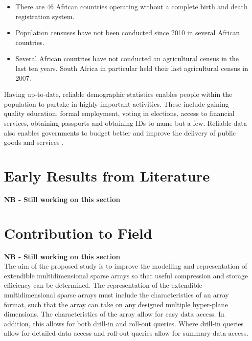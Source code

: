 \begin{itemize}
	\item There are 46 African countries operating without a complete birth and death registration system.
	\item Population censuses have not been conducted since 2010 in several African countries.
	\item Several African countries have not conducted an agricultural census in the last ten years. South Africa in particular held their last agricultural census in 2007.
\end{itemize}

Having up-to-date, reliable demographic statistics enables people within the population to partake in highly important activities. These include gaining quality education, formal employment, voting in elections, access to financial services, obtaining passports and obtaining IDs to name but a few. Reliable data also enables governments to budget better and improve the delivery of public goods and services \cite{mo:2015:sin}.

\section{Early Results from Literature}
\textbf{NB - Still working on this section}

\section{Contribution to Field}
\textbf{NB - Still working on this section}\\
The aim of the proposed study is to improve the modelling and representation of extendible multidimensional sparse arrays so that useful compression and storage efficiency can be determined. The representation of the extendible multidimensional sparse arrays must include the characteristics of an array format, such that the array can take on any designed multiple hyper-plane dimensions. The characteristics of the array allow for easy data access. In addition, this allows for both drill-in and roll-out queries. Where drill-in queries allow for detailed data access and roll-out queries allow for summary data access.

